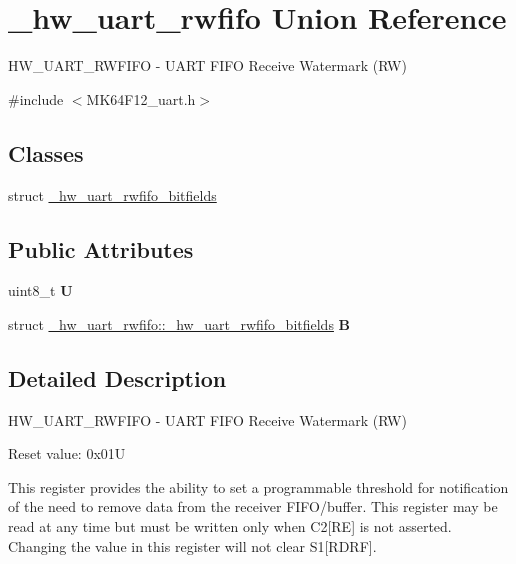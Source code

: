 \hypertarget{union__hw__uart__rwfifo}{}\section{\+\_\+hw\+\_\+uart\+\_\+rwfifo Union Reference}
\label{union__hw__uart__rwfifo}


H\+W\+\_\+\+U\+A\+R\+T\+\_\+\+R\+W\+F\+I\+FO -\/ U\+A\+RT F\+I\+FO Receive Watermark (RW)  




{\ttfamily \#include $<$M\+K64\+F12\+\_\+uart.\+h$>$}

\subsection*{Classes}
\begin{DoxyCompactItemize}
\item 
struct \hyperlink{struct__hw__uart__rwfifo_1_1__hw__uart__rwfifo__bitfields}{\+\_\+hw\+\_\+uart\+\_\+rwfifo\+\_\+bitfields}
\end{DoxyCompactItemize}
\subsection*{Public Attributes}
\begin{DoxyCompactItemize}
\item 
uint8\+\_\+t {\bfseries U}\hypertarget{union__hw__uart__rwfifo_a5e80c500a778d46f1286df5c8d2fba70}{}\label{union__hw__uart__rwfifo_a5e80c500a778d46f1286df5c8d2fba70}

\item 
struct \hyperlink{struct__hw__uart__rwfifo_1_1__hw__uart__rwfifo__bitfields}{\+\_\+hw\+\_\+uart\+\_\+rwfifo\+::\+\_\+hw\+\_\+uart\+\_\+rwfifo\+\_\+bitfields} {\bfseries B}\hypertarget{union__hw__uart__rwfifo_a79e0150185704d417fbb358186d6f5b1}{}\label{union__hw__uart__rwfifo_a79e0150185704d417fbb358186d6f5b1}

\end{DoxyCompactItemize}


\subsection{Detailed Description}
H\+W\+\_\+\+U\+A\+R\+T\+\_\+\+R\+W\+F\+I\+FO -\/ U\+A\+RT F\+I\+FO Receive Watermark (RW) 

Reset value\+: 0x01U

This register provides the ability to set a programmable threshold for notification of the need to remove data from the receiver F\+I\+F\+O/buffer. This register may be read at any time but must be written only when C2\mbox{[}RE\mbox{]} is not asserted. Changing the value in this register will not clear S1\mbox{[}R\+D\+RF\mbox{]}. 

